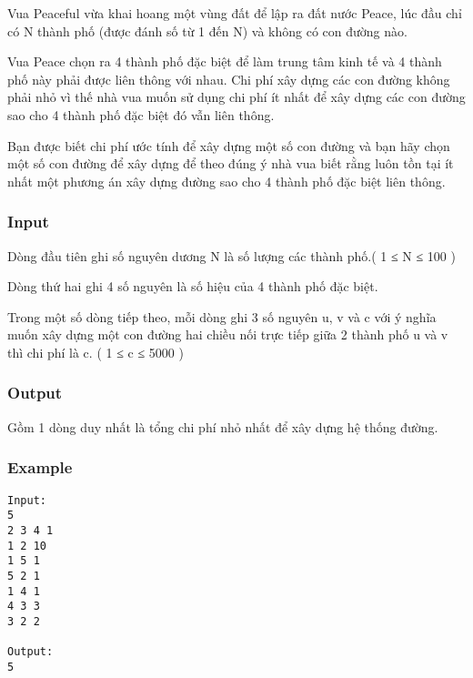 



   Vua Peaceful vừa khai hoang một vùng đất để lập ra đất nước Peace, lúc đầu chỉ có N thành phố (được đánh số từ 1 đến N) và không có con đường nào.  

   Vua Peace chọn ra 4 thành phố đặc biệt để làm trung tâm kinh tế và 4 thành phố này phải được liên thông với nhau. Chi phí xây dựng các con đường không phải nhỏ vì thế nhà vua muốn sử dụng chi phí ít nhất để xây dựng các con đường sao cho 4 thành phố đặc biệt đó vẫn liên thông.  

   Bạn được biết chi phí ước tính để xây dựng một số con đường và bạn hãy chọn một số con đường để xây dựng để theo đúng ý nhà vua biết rằng luôn tồn tại ít nhất một phương án xây dựng đường sao cho 4 thành phố đặc biệt liên thông.  

\subsubsection{   Input  }

   Dòng đầu tiên ghi số nguyên dương N là số lượng các thành phố.( 1 ≤ N ≤ 100 )  

   Dòng thứ hai ghi 4 số nguyên là số hiệu của 4 thành phố đặc biệt.  

   Trong một số dòng tiếp theo, mỗi dòng ghi 3 số nguyên u, v và c với ý nghĩa muốn xây dựng một con đường hai chiều nối trực tiếp giữa 2 thành phố u và v thì chi phí là c.  ( 1 ≤ c ≤ 5000 )  

\subsubsection{   Output  }

   Gồm 1 dòng duy nhất là tổng chi phí nhỏ nhất để xây dựng hệ thống đường.  

\subsubsection{   Example  }
\begin{verbatim}
Input:
5
2 3 4 1
1 2 10
1 5 1
5 2 1
1 4 1
4 3 3
3 2 2

Output:
5
\end{verbatim}